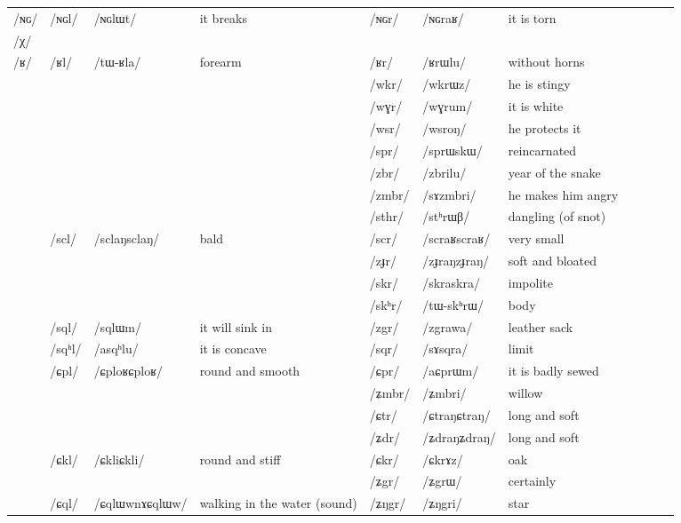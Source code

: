 \documentclass[oldfontcommands,oneside,a4paper,11pt]{article}
\newcommand{\ipa}[1]{\mbox{/#1/}} %
\newcommand{\deux}[1]{/#1/}
\newcommand{\trois}[1]{/#1/}
\newcommand{\tib}[1]{\cellcolor{lightgray}\textbf{#1}}
\newcommand{\idph}[1]{\cellcolor{gray}\textbf{#1}}
\begin{document}
\begin{landscape}
\begin{longtable}{l|lll|lll|lll|l}
\ipa{ɴɢ} 	& \deux{ɴɢl} 	& \ipa{ɴɢlɯt} 	& it breaks 	& \deux{ɴɢr} 	& \ipa{ɴɢraʁ} 	&it is torn \\	
\ipa{χ} 	&  	&  	&  	&  	&  	& \\	
\ipa{ʁ} 	& \deux{ʁl} 	& \ipa{tɯ-ʁla} 	& forearm 	& \deux{ʁr} 	& \ipa{ʁrɯlu} 	& without horns\\	
\midrule							
	&	&	&	&\trois{wkr}  	& \ipa{wkrɯz}  	&he is stingy \\	
	&	&	&	&\trois{wɣr}  	&\ipa{wɣrum}  	&it is white\\	
	&	&	&  	&\trois{wsr}  	&\ipa{wsroŋ}  	&he protects it\\	
\midrule							
	&	&	&	&\trois{spr}  	& \ipa{sprɯskɯ}  	&  reincarnated\\	
	&	&	&	&\trois{zbr}  \tib{} 	& \ipa{zbrilu}  	& year of the snake \\	
	&	&	&	&\trois{zmbr}  	& \ipa{sɤzmbri}  	& he makes him angry\\	
	&	&	&	&\trois{sthr}  \idph{} 	& \ipa{stʰrɯβ}  	& dangling (of snot) \\	
	&\trois{scl}  \idph{}	& \ipa{sclaŋsclaŋ}  	& bald	&\trois{scr}  \idph{}	& \ipa{scraʁscraʁ}  	& very small	&\\
	&	&	&	&\trois{zɟr} \idph{} 	& \ipa{zɟraŋzɟraŋ}  	& soft and bloated\\	
	&	&	&	&\trois{skr}  	& \ipa{skraskra}  	& impolite \\	
	&	&	&	&\trois{skʰr}  	& \ipa{tɯ-skʰrɯ}  	& body \\	
	&\trois{sql}  	& \ipa{sqlɯm}  	&it will sink in 	&\trois{zgr} \tib{} 	& \ipa{zgrawa}    	&leather sack\\	
	&\trois{sqʰl}  	& \ipa{asqʰlu}  	&it is concave 	&\trois{sqr}  	& \ipa{sɤsqra}   	&limit\\	
\midrule							
	&\trois{ɕpl}	&\ipa{ɕploʁɕploʁ}	&round and smooth	&\trois{ɕpr}  	& \ipa{aɕprɯm}  	& it is badly sewed\\	
	&	&	&	&\trois{ʑmbr}  	& \ipa{ʑmbri}  	& willow\\	
	&	&	&	&\trois{ɕtr}  \idph{}	& \ipa{ɕtraŋɕtraŋ}  	& long and soft\\	
	&	&	&	&\trois{ʑdr}  \idph{}	& \ipa{ʑdraŋʑdraŋ}  	&  long and soft\\	
	&\trois{ɕkl}	&\ipa{ɕkliɕkli}	&round and stiff	&\trois{ɕkr}  	& \ipa{ɕkrɤz}  	&oak \\	
	&	&	&	&\trois{ʑgr}  	& \ipa{ʑgrɯ}  	&certainly \\	
	&\trois{ɕql}  \idph{}	& \ipa{ɕqlɯwnɤɕqlɯw}  	&  walking in the water (sound)	&\trois{ʑŋgr}  	& \ipa{ʑŋgri}  	&star \\	

\end{longtable}
\end{landscape}
\end{document}
